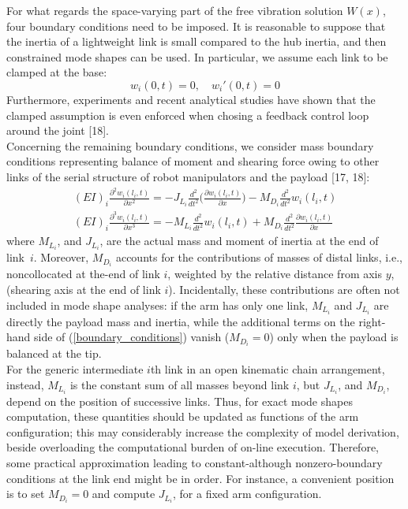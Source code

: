 \documentclass[a4paper,12pt,oneside]{report}
\begin{document}
For what regards the space-varying part of the free vibration solution $W(x)$, four boundary conditions need to be imposed. It is reasonable to suppose that the inertia of a lightweight link is small compared to the hub inertia, and then constrained mode shapes can be used. In particular, we assume each link to be clamped at the base:
\begin{equation}
  w_i(0,t)=0, \quad w_i'(0,t)=0
\end{equation} 
Furthermore, experiments and recent analytical studies have shown that the clamped assumption is even enforced when chosing a feedback control loop around the joint [18].\\
Concerning the remaining boundary conditions, we consider mass boundary conditions representing balance of moment and shearing force owing to other links of the serial structure of robot manipulators and the payload [17, 18]:
\begin{equation}
  \begin{array}{c}
  (EI)_i\frac{\partial^2w_i(l_i,t)}{\partial x^2}=-J_{L_i}\frac{d^2}{dt^2}\Big(\frac{\partial w_i(l_i,t)}{\partial x}\Big)-M_{D_i}\frac{d^2}{dt^2}w_i(l_i,t)\\
  (EI)_i\frac{\partial^3w_i(l_i,t)}{\partial x^3}=-M_{L_i}\frac{d^2}{dt^2}w_i(l_i,t)+M_{D_i}\frac{d^2}{dt^2}\frac{\partial w_i(l_i,t)}{\partial x}
  \end{array}
  \label{boundary_conditions}
\end{equation}
where $M_{L_i}$, and $J_{L_i}$, are the actual mass and moment of inertia at the end of link~$i$. Moreover, $M_{D_i}$ accounts for the contributions of masses of distal links, i.e., noncollocated at the-end of link $i$, weighted by the relative distance from axis $y$, (shearing axis at the end of link $i$). Incidentally, these contributions are often not included in mode shape analyses: if the arm has only one link, $M_{L_i}$  and $J_{L_i}$ are directly the payload mass and inertia, while the additional terms on the right-hand side of (\ref{boundary_conditions}) vanish ($M_{D_i}=0$) only when the payload is balanced at the tip.\\ 
For the generic intermediate $i$th link in an open kinematic chain arrangement, instead, $M_{L_i}$ is the constant sum of all masses beyond link $i$, but $J_{L_i}$, and $M_{D_i}$, depend on the position of successive links. Thus, for exact mode shapes computation, these quantities should be updated as functions of the arm configuration; this may considerably increase the complexity of model derivation, beside overloading the computational burden of on-line execution. Therefore, some practical approximation leading to constant-although nonzero-boundary conditions at the link end might be in order. For instance, a convenient position is to set $M_{D_i}=0$ and compute $J_{L_i}$, for a fixed arm configuration.\\
\end{document}
